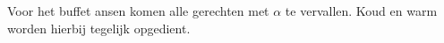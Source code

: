 Voor het buffet ansen komen alle gerechten met $\alpha$ te vervallen.
Koud en warm worden hierbij tegelijk opgedient.
